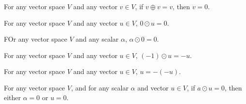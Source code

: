 \begin{lemma}
  For any vector space $V$ and any vector $v \in V$, if $v \oplus v = v$, then $v = 0$.
\end{lemma}

\begin{theorem}
  For any vector space $V$ and any vector $u \in V$, $0 \odot u = 0$.
\end{theorem}

\begin{theorem}
  FOr any vector space $V$ and any scalar $\alpha$, $\alpha \odot 0 = 0$.
\end{theorem}

\begin{theorem}
  For any vector space $V$ and any vector $u \in V$, $(-1) \odot u = -u$.
\end{theorem}

\begin{theorem}
  For any vector space $V$ and any vector $u \in V$, $u = -(-u)$.
\end{theorem}

\begin{theorem}
  For any vector space $V$, and for any scalar $\alpha$ and vector $u \in V$, if 
  $a \odot u = 0$, then either $\alpha = 0$ or $u = 0$.
\end{theorem}





